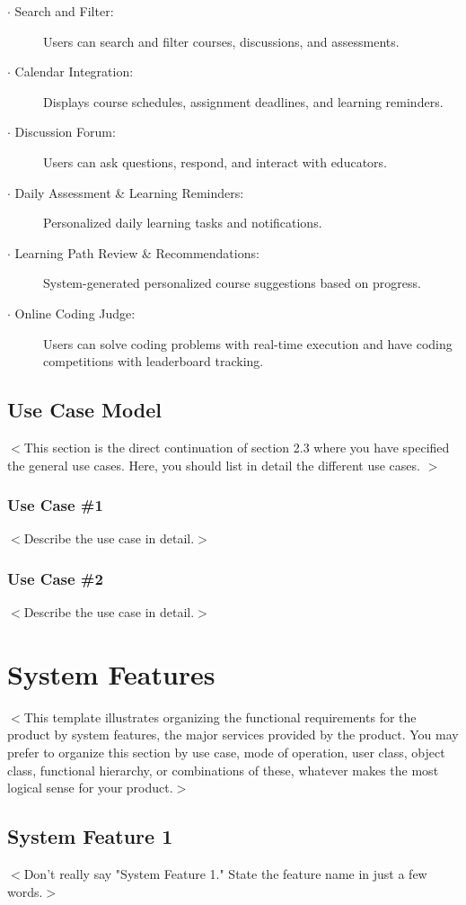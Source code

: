 \documentclass[a4paper, 11pt]{scrreprt}
\begin{document}
\begin{description}
\begin{enumerate}
        \end{enumerate}
    \item[$\cdot$ Search and Filter:] Users can search and filter courses, discussions, and assessments.
    \item[$\cdot$ Calendar Integration:] Displays course schedules, assignment deadlines, and learning reminders.
    \item[$\cdot$ Discussion Forum:] Users can ask questions, respond, and interact with educators.
    \item[$\cdot$ Daily Assessment \& Learning Reminders:] Personalized daily learning tasks and notifications.
    \item[$\cdot$ Learning Path Review \& Recommendations:] System-generated personalized course suggestions based on progress.
    \item[$\cdot$ Online Coding Judge:] Users can solve coding problems with real-time execution and have coding competitions with leaderboard tracking.
\end{description}

\section{Use Case Model}
$<$This section is the direct continuation of section 2.3 where you have specified 
the general use cases. Here, you should list in detail the different use cases. 
$>$
\subsection{Use Case \#1}
$<$Describe the use case in detail.$>$

\subsection{Use Case \#2}
$<$Describe the use case in detail.$>$


\chapter{System Features}
$<$This template illustrates organizing the functional requirements for the 
product by system features, the major services provided by the product. You may 
prefer to organize this section by use case, mode of operation, user class, 
object class, functional hierarchy, or combinations of these, whatever makes the 
most logical sense for your product.$>$

\section{System Feature 1}
$<$Don't really say "System Feature 1." State the feature name in just a few 
words.$>$
\end{document}

